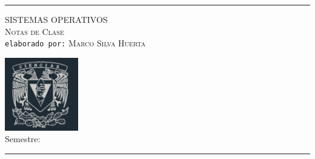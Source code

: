 \begin{center}
        \rule[1.5ex]{1\linewidth}{0.5mm} 
\end{center}

\begin{minipage}{12cm}
    {\Large\textsc{SISTEMAS OPERATIVOS}} \\

    {\large\textsc{Notas de Clase}}\\            
    
    \texttt{elaborado por:} {\large \textsc{Marco Silva Huerta}}\\ 
        
\end{minipage}
\begin{minipage}{4.1cm}
    \includegraphics[height=3.2cm]{assets/imagenes/cienciasBLRY.png}\\    
    Semestre: \semestre
\end{minipage}

\begin{center}
    \rule[1.5ex]{1\linewidth}{0.5mm} 
\end{center}
